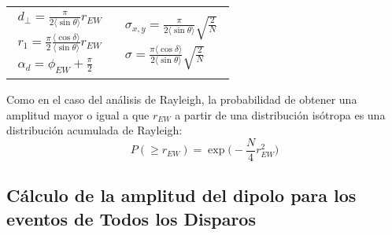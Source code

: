 \begin{tabular}{@{}p{.4\linewidth}@{}p{.5\linewidth}@{}}
    \begin{align}
        d_{\perp} = \frac{\pi}{2\langle\sin\theta \rangle} r_{EW} \label{dperp} \\
        r_1   =\frac{\pi}{2} \frac{\langle\cos\delta \rangle}{\langle\sin\theta \rangle} r_{EW} \label{r_fisico}  \\
        \alpha_d = \phi_{EW} + \frac{\pi}{2} \label{phase_fisico}
    \end{align}
    &    \begin{align}
        \sigma_{x,y} = \frac{\pi}{2\langle\sin\theta \rangle} \sqrt{\frac{2}{N}}\\
        \sigma   = \frac{\pi \langle\cos\delta \rangle}{2\langle\sin\theta \rangle} \sqrt{\frac{2}{N}}
    \end{align}
  \end{tabular}

Como en el caso del análisis de Rayleigh, la probabilidad de obtener una amplitud mayor o igual a que $r_{EW}$ a partir de una distribución isótropa es una distribución acumulada de Rayleigh:
\begin{equation}
    P(\geq r_{EW}) = \exp \Big(-\frac{N}{4}r^2_{EW}\Big) \label{p99}
\end{equation}

\subsection{Cálculo  de la amplitud del dipolo para los eventos de Todos los Disparos}

